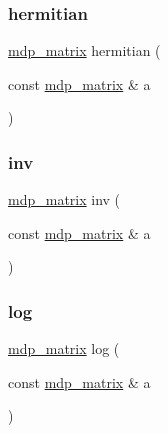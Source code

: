 \subsubsection{\texorpdfstring{hermitian}{hermitian}}
{\footnotesize\ttfamily \hyperlink{classmdp__matrix}{mdp\+\_\+matrix} hermitian (\begin{DoxyParamCaption}\item[{const \hyperlink{classmdp__matrix}{mdp\+\_\+matrix} \&}]{a }\end{DoxyParamCaption})\hspace{0.3cm}{\ttfamily [friend]}}

\mbox{\label{classmdp__matrix_a01d58a336c980c060907abb7141eedee}} 
\subsubsection{\texorpdfstring{inv}{inv}}
{\footnotesize\ttfamily \hyperlink{classmdp__matrix}{mdp\+\_\+matrix} inv (\begin{DoxyParamCaption}\item[{const \hyperlink{classmdp__matrix}{mdp\+\_\+matrix} \&}]{a }\end{DoxyParamCaption})\hspace{0.3cm}{\ttfamily [friend]}}

\mbox{\label{classmdp__matrix_a173074a62f14de569920183069485652}} 
\subsubsection{\texorpdfstring{log}{log}}
{\footnotesize\ttfamily \hyperlink{classmdp__matrix}{mdp\+\_\+matrix} log (\begin{DoxyParamCaption}\item[{const \hyperlink{classmdp__matrix}{mdp\+\_\+matrix} \&}]{a }\end{DoxyParamCaption})\hspace{0.3cm}{\ttfamily [friend]}}

\mbox{\label{classmdp__matrix_a91537cc4584a782ada453ae45843ec0f}} 
